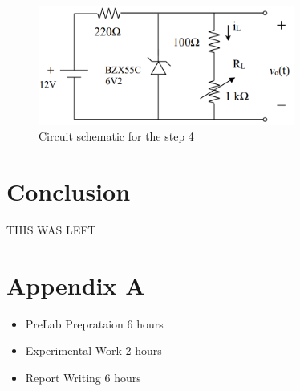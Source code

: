\documentclass[letterpaper,12pt]{article}
\begin{document}
\begin{figure}[H]
    \centering
    \includegraphics[width = 0.75\textwidth]{4_1.png}
    \caption{Circuit schematic for the step 4}
\end{figure} 
    
    
\section{Conclusion}

THIS WAS LEFT 

\section*{Appendix A}
\begin{itemize}
    \item PreLab Preprataion 6 hours
    \item Experimental Work 2  hours
    \item Report Writing 6 hours
\end{itemize}
\end{document}
